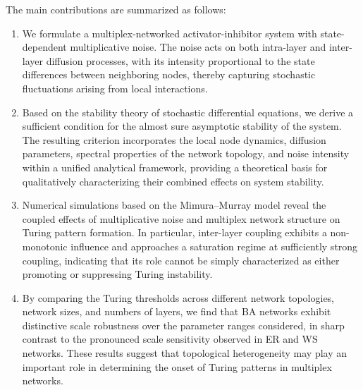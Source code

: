 \documentclass{SCIS2026}
\begin{document}
The main contributions are summarized as follows:
\begin{enumerate}
	\item We formulate a multiplex-networked activator-inhibitor system with state-dependent multiplicative noise. The noise acts on both intra-layer and inter-layer diffusion processes, with its intensity proportional to the state differences between neighboring nodes, thereby capturing stochastic fluctuations arising from local interactions.
	\item Based on the stability theory of stochastic differential equations, we derive a sufficient condition for the almost sure asymptotic stability of the system. The resulting criterion incorporates the local node dynamics, diffusion parameters, spectral properties of the network topology, and noise intensity within a unified analytical framework, providing a theoretical basis for qualitatively characterizing their combined effects on system stability.
	\item Numerical simulations based on the Mimura–Murray model reveal the coupled effects of multiplicative noise and multiplex network structure on Turing pattern formation. In particular, inter-layer coupling exhibits a non-monotonic influence and approaches a saturation regime at sufficiently strong coupling, indicating that its role cannot be simply characterized as either promoting or suppressing Turing instability.
	\item By comparing the Turing thresholds across different network topologies, network sizes, and numbers of layers, we find that BA networks exhibit distinctive scale robustness over the parameter ranges considered, in sharp contrast to the pronounced scale sensitivity observed in ER and WS networks. These results suggest that topological heterogeneity may play an important role in determining the onset of Turing patterns in multiplex networks.
\end{enumerate}

\end{document}
